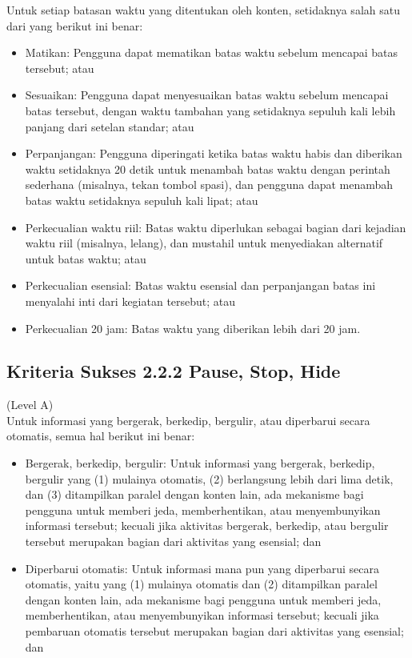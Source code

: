Untuk setiap batasan waktu yang ditentukan oleh konten, setidaknya salah satu dari yang berikut ini benar:

\begin{itemize}
	\item Matikan: Pengguna dapat mematikan batas waktu sebelum mencapai batas tersebut; atau
	\item Sesuaikan: Pengguna dapat menyesuaikan batas waktu sebelum mencapai batas tersebut, dengan waktu tambahan yang setidaknya sepuluh kali lebih panjang dari setelan standar; atau
	\item Perpanjangan: Pengguna diperingati ketika batas waktu habis dan diberikan waktu setidaknya 20 detik untuk menambah batas waktu dengan perintah sederhana (misalnya, tekan tombol spasi), dan pengguna dapat menambah batas waktu setidaknya sepuluh kali lipat; atau
	\item Perkecualian waktu riil: Batas waktu diperlukan sebagai bagian dari kejadian waktu riil (misalnya, lelang), dan mustahil untuk menyediakan alternatif untuk batas waktu; atau
	\item Perkecualian esensial: Batas waktu esensial dan perpanjangan batas ini menyalahi inti dari kegiatan tersebut; atau
	\item Perkecualian 20 jam: Batas waktu yang diberikan lebih dari 20 jam.
\end{itemize}

\subsection{Kriteria Sukses 2.2.2 Pause, Stop, Hide}
\label{subsec:kriteria_2.2.2}
(Level A) \\

Untuk informasi yang bergerak, berkedip, bergulir, atau diperbarui secara otomatis, semua hal berikut ini benar:

\begin{itemize}
	\item Bergerak, berkedip, bergulir: Untuk informasi yang bergerak, berkedip, bergulir yang (1) mulainya otomatis, (2) berlangsung lebih dari lima detik, dan (3) ditampilkan paralel dengan konten lain, ada mekanisme bagi pengguna untuk memberi jeda, memberhentikan, atau menyembunyikan informasi tersebut; kecuali jika aktivitas bergerak, berkedip, atau bergulir tersebut merupakan bagian dari aktivitas yang esensial; dan
	\item Diperbarui otomatis: Untuk informasi mana pun yang diperbarui secara otomatis, yaitu yang (1) mulainya otomatis dan (2) ditampilkan paralel dengan konten lain, ada mekanisme bagi pengguna untuk memberi jeda, memberhentikan, atau menyembunyikan informasi tersebut; kecuali jika pembaruan otomatis tersebut merupakan bagian dari aktivitas yang esensial; dan
\end{itemize}

